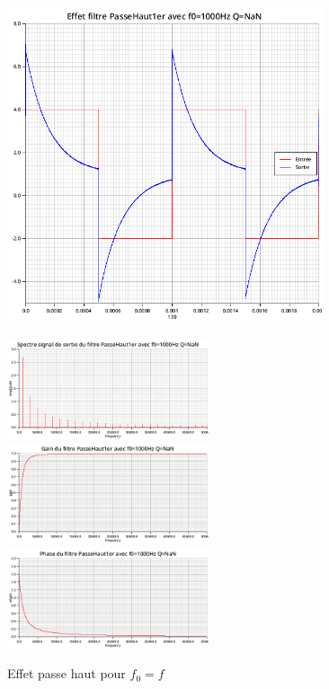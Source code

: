 \documentclass{article}
\begin{document}
\begin{figure}[H]
  \begin{minipage}{0.6\textwidth}
      \centering
      \includegraphics[width=25em]{images/creneau/haut/1/signals.png}
  \end{minipage}
  \begin{minipage}{0.3\textwidth}
      \centering
      \includegraphics[width=16em]{images/creneau/haut/1/fft_out.png}
      \vfill
      \includegraphics[width=16em]{images/creneau/haut/1/gain.png}
      \vfill
      \includegraphics[width=16em]{images/creneau/haut/1/phase.png}
  \end{minipage}
  \caption{Effet passe haut pour $f_0=f$}
\end{figure}
\end{document}
